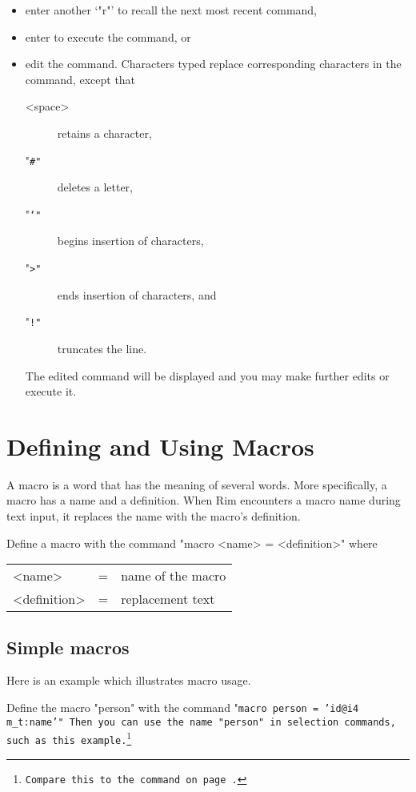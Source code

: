 \documentclass[11pt,a4paper]{report}
\def\I{\index}
\begin{document}
\begin{itemize}
\item enter another `"r"' to recall the next most recent command,
\item enter  to execute the command, or
\item edit the command.  Characters typed replace corresponding
  characters in the command, except that
 
  \begin{description}
  \item[<space>] retains a character,
  \item["\tt \#"] deletes a letter,
  \item["\tt \char`"] begins insertion of characters,
  \item["\tt >"] ends insertion of characters, and
  \item["\tt !"] truncates the line.
  \end{description}
 
  The edited command will be displayed and you may make further
  edits or execute it.
 
\end{itemize}
 
%
%
\chapter{Defining and Using Macros}
\I{macros|(}
\label{mac-chapter}
A macro is a word that has the meaning of several words.
More specifically, a macro has a name and a definition.
When Rim encounters a macro name during text input, it
replaces the name with the macro's definition.
 
Define a macro with the command
\I{macro@"macro"}
"macro <name> = <definition>"
where
 \begin{tabular}{lcl}
   <name> &=& name of the macro\\
   <definition> &=& replacement text
   \end{tabular}
 
\section{Simple macros}
Here is an example which illustrates macro usage.
 
Define the macro "person" with the command
"\tt macro person = 'id@i4 m\_t:name'"
Then you can use the name "person" in selection commands, such as
this example.\footnote{Compare this to the command on
page~\pageref{sel-dem1}.}
 
\end{document}
